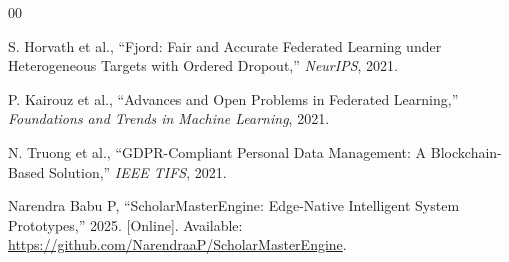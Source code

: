 \documentclass[conference]{IEEEtran}
\begin{document}
\begin{thebibliography}{00}

 S. Horvath et al., ``Fjord: Fair and Accurate Federated Learning under Heterogeneous Targets with Ordered Dropout,'' \textit{NeurIPS}, 2021.


 P. Kairouz et al., ``Advances and Open Problems in Federated Learning,'' \textit{Foundations and Trends in Machine Learning}, 2021.


 N. Truong et al., ``GDPR-Compliant Personal Data Management: A Blockchain-Based Solution,'' \textit{IEEE TIFS}, 2021.

 Narendra Babu P, ``ScholarMasterEngine: Edge-Native Intelligent System Prototypes,'' 2025. [Online]. Available: \url{https://github.com/NarendraaP/ScholarMasterEngine}.

\end{thebibliography}
\end{document}
